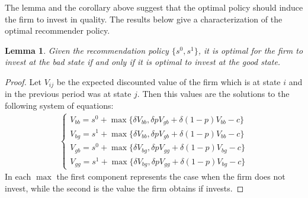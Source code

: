 \documentclass[a4paper]{article}
\newtheorem{lemma}[theorem]{Lemma}
\begin{document}
The lemma and the corollary above suggest that the optimal policy should induce the firm to invest in quality. The results below give a characterization of the optimal recommender policy.
\begin{lemma}
	Given the recommendation policy $\{s^0, s^1\}$, it is optimal for the firm to invest at the bad state if and only if it is optimal to invest at the good state.
\end{lemma} 
\begin{proof}
	Let $V_{ij}$ be the expected discounted value of the firm which is at state $i$ and in the previous period was at state $j$. Then this values are the solutions to the following system of equations:
	\begin{align}\label{eq1}
	\begin{cases}
	V_{bb} = s^0 + \max\{\delta V_{bb}, \delta p V_{gb} + \delta (1-p)V_{bb} - c\}\\
	V_{bg} = s^1 + \max\{\delta V_{bb}, \delta p V_{gb} + \delta (1-p)V_{bb} - c\}\\
	V_{gb} = s^0 + \max\{\delta V_{bg}, \delta p V_{gg} + \delta (1-p)V_{bg} - c\}\\
	V_{gg} = s^1 + \max\{\delta V_{bg}, \delta p V_{gg} + \delta (1-p)V_{bg} - c\}
	\end{cases}
	\end{align}
	In each $\max$ the first component represents the case when the firm does not invest, while the second is the value the firm obtains if invests. 
	

\end{proof}
\end{document}
